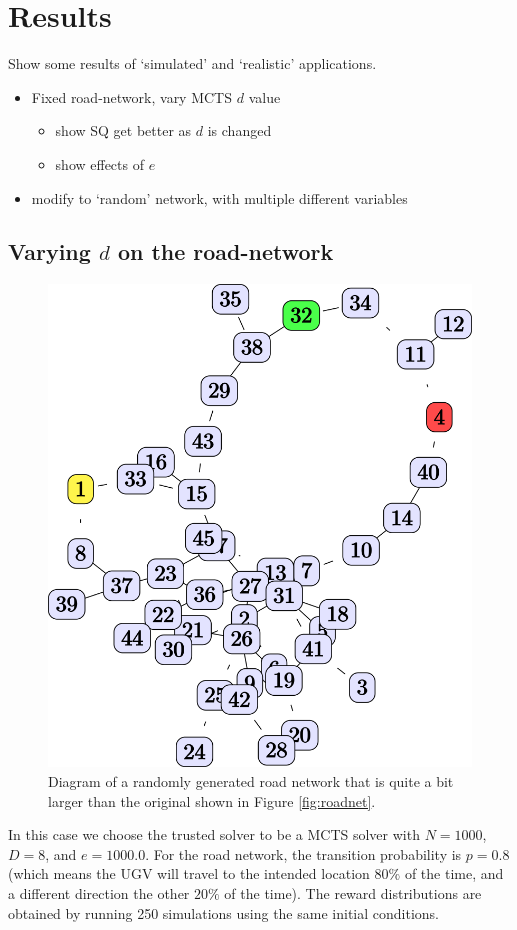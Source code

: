 \section{Results}
Show some results of `simulated' and `realistic' applications.

\begin{itemize}
    \item Fixed road-network, vary MCTS $d$ value
    \begin{itemize}
        \item show SQ get better as $d$ is changed 
        \item show effects of $e$
    \end{itemize}
    \item modify to `random' network, with multiple different variables
\end{itemize}

\subsection{Varying $d$ on the road-network}

\begin{figure}[tbp]
    \centering
    \includegraphics[width=0.4\linewidth]{Figures/medium_roadnet.png}
    \caption{Diagram of a randomly generated road network that is quite a bit larger than the original shown in Figure \ref{fig:roadnet}.}
    \label{fig:med_roadnet}
\end{figure}

In this case we choose the trusted solver to be a MCTS solver with $N=1000$, $D=8$, and $e=1000.0$. For the road network, the transition probability is $p=0.8$ (which means the UGV will travel to the intended location $80\%$ of the time, and a different direction the other $20\%$ of the time). The reward distributions are obtained by running 250 simulations using the same initial conditions.

